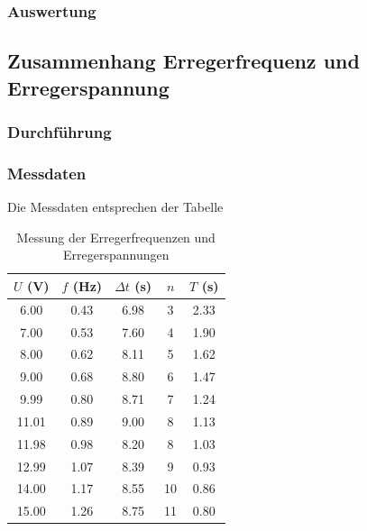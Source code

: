 \documentclass{article}
\begin{document}
\subsubsection{Auswertung}

\subsection{Zusammenhang Erregerfrequenz und Erregerspannung}
\subsubsection{Durchführung}
\subsubsection{Messdaten}
Die Messdaten entsprechen der Tabelle

\begin{table}[!htb]
    \centering
    \begin{tabular}{|c|c|c|c|c|}
    \hline
    $U$ (V) & $f$ (Hz) & $\Delta t$ (s) & $n$ & $T$ (s) \\
    \hline
    6.00 & 0.43 & 6.98 & 3 & 2.33 \\
    7.00 & 0.53 & 7.60 & 4 & 1.90 \\
    8.00 & 0.62 & 8.11 & 5 & 1.62 \\
    9.00 & 0.68 & 8.80 & 6 & 1.47 \\
    9.99 & 0.80 & 8.71 & 7 & 1.24 \\
    11.01 & 0.89 & 9.00 & 8 & 1.13 \\
    11.98 & 0.98 & 8.20 & 8 & 1.03 \\
    12.99 & 1.07 & 8.39 & 9 & 0.93 \\
    14.00 & 1.17 & 8.55 & 10 & 0.86 \\
    15.00 & 1.26 & 8.75 & 11 & 0.80 \\
    \hline
    \end{tabular}
    \caption{Messung der Erregerfrequenzen und Erregerspannungen}
    \label{tab:messung_erregerfrequenz_spannung}
\end{table}
\end{document}
